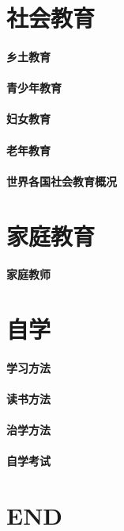 \documentclass[UTF8]{../../ApplicationUniverse}
\begin{document}
\chapter{社会教育}
    \subsubsection{乡土教育}
    \subsubsection{青少年教育}
    \subsubsection{妇女教育}
    \subsubsection{老年教育}
    \subsubsection{世界各国社会教育概况}



    
\chapter{家庭教育}
    \subsubsection{家庭教师}





\chapter{自学}
    \subsubsection{学习方法}
    \subsubsection{读书方法}
    \subsubsection{治学方法}
    \subsubsection{自学考试}




\chapter{END}
\end{document}
